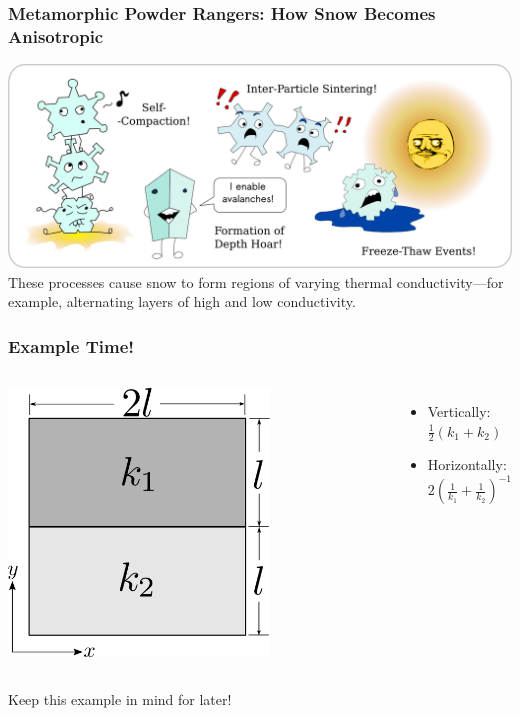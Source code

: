 \documentclass{beamer}
\begin{document}
\begin{frame}
\frametitle{Metamorphic Powder Rangers: How Snow Becomes Anisotropic}
\includegraphics[width=\textwidth]{fig/metamorphism.png}\\
These processes cause snow to form regions of varying thermal conductivity---for
example, alternating layers of high and low conductivity.
\end{frame}


\begin{frame}
\frametitle{Example Time!}
\begin{columns}[c]
    \includegraphics[width=0.7\textwidth]{fig/ex_laminate.png}
    \begin{itemize}
    \item Vertically: \(\frac12(k_1 + k_2)\)
    \item Horizontally: \(2\left( \frac1{k_1} + \frac1{k_2} \right)^{-1}\)
    \end{itemize}
\end{columns}
\smallskip
Keep this example in mind for later!
\end{frame}
\end{document}
